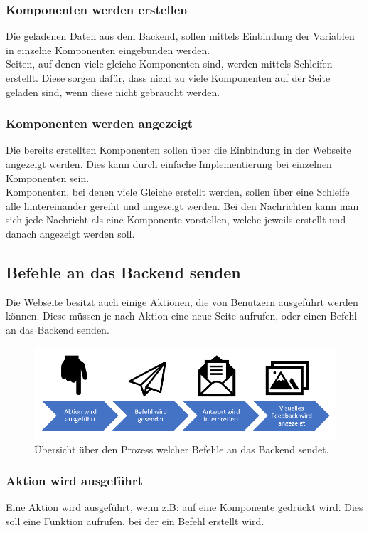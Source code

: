 \subsubsection{Komponenten werden erstellen}
Die geladenen Daten aus dem Backend, sollen mittels Einbindung der Variablen in einzelne Komponenten eingebunden werden.\\
Seiten, auf denen viele gleiche Komponenten sind, werden mittels Schleifen erstellt. Diese sorgen dafür, dass nicht zu viele Komponenten auf der Seite geladen sind, wenn diese nicht gebraucht werden.

\subsubsection{Komponenten werden angezeigt}
Die bereits erstellten Komponenten sollen über die Einbindung in der Webseite angezeigt werden. Dies kann durch einfache Implementierung bei einzelnen Komponenten sein.\\
Komponenten, bei denen viele Gleiche erstellt werden, sollen über eine Schleife alle hintereinander gereiht und angezeigt werden.
Bei den Nachrichten kann man sich jede Nachricht als eine Komponente vorstellen, welche jeweils erstellt und danach angezeigt werden soll.
\newpage
\subsection{Befehle an das Backend senden}
Die Webseite besitzt auch einige Aktionen, die von Benutzern ausgeführt werden können. Diese müssen je nach Aktion eine neue Seite aufrufen, oder einen Befehl an das Backend senden.

\begin{figure}[H]
	\centering
	\includegraphics[width=0.8\linewidth]{images/Prozess_Befehl_senden}
	\caption[Prozess der Befehlssendung]{Übersicht über den Prozess welcher Befehle an das Backend sendet.}
	\label{fig:prozessbefehlsenden}
\end{figure}

\subsubsection{Aktion wird ausgeführt}
Eine Aktion wird ausgeführt, wenn z.B: auf eine Komponente gedrückt wird. Dies soll eine Funktion aufrufen, bei der ein Befehl erstellt wird.

